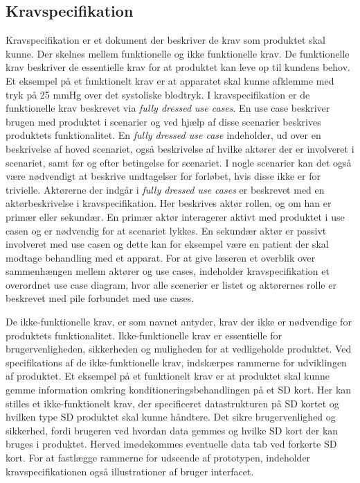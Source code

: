 	\subsection{Kravspecifikation} \label{title:kravspecifikation}
	Kravspecifikation er et dokument der beskriver de krav som produktet skal kunne. Der skelnes mellem funktionelle og ikke funktionelle krav. De funktionelle krav beskriver de essentielle krav for at produktet kan leve op til kundens behov. Et eksempel på et funktionelt krav er at apparatet skal kunne afklemme med tryk på 25 mmHg over det systoliske blodtryk. I kravspecifikation er de funktionelle krav beskrevet via \textit{fully dressed use cases}. En use case beskriver brugen med produktet i scenarier og ved hjælp af disse scenarier beskrives produktets funktionalitet. En \textit{fully dressed use case} indeholder, ud over en beskrivelse af hoved scenariet, også beskrivelse af hvilke aktører der er involveret i scenariet, samt før og efter betingelse for scenariet. I nogle scenarier kan det også være nødvendigt at beskrive undtagelser for forløbet, hvis disse ikke er for trivielle. Aktørerne der indgår i \textit{fully dressed use cases} er beskrevet med en aktørbeskrivelse i kravspecifikation. Her beskrives aktør rollen, og om han er primær eller sekundær. En primær aktør interagerer aktivt med produktet i use casen og er nødvendig for at scenariet lykkes. En sekundær aktør er passivt involveret med use casen og dette kan for eksempel være en patient der skal modtage behandling med et apparat. For at give læseren et overblik over sammenhængen mellem aktører og use cases, indeholder kravspecifikation et overordnet use case diagram, hvor alle scenerier er listet og aktørernes rolle er beskrevet med pile forbundet med use cases. 
	
	De ikke-funktionelle krav, er som navnet antyder, krav der ikke er nødvendige for produktets funktionalitet. Ikke-funktionelle krav er essentielle for brugervenligheden, sikkerheden og muligheden for at vedligeholde produktet. Ved specifikations af de ikke-funktionelle krav, indskærpes rammerne for udviklingen af produktet. Et eksempel på et funktionelt krav er at produktet skal kunne gemme information omkring konditioneringsbehandlingen på et SD kort. Her kan stilles et ikke-funktionelt krav, der specificeret datastrukturen på SD kortet og hvilken type SD produktet skal kunne håndtere. Det sikre brugervenlighed og sikkerhed, fordi brugeren ved hvordan data gemmes og hvilke SD kort der kan bruges i produktet. Herved imødekommes eventuelle data tab ved forkerte SD kort. For at fastlægge rammerne for udseende af prototypen, indeholder kravspecifikationen også illustrationer af bruger interfacet. 
	
